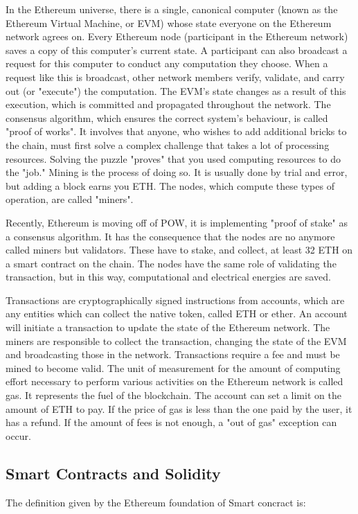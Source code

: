 \documentclass[a4paper,sigconf, language=french,
language=german, language=spanish, language=english]{acmart}
\begin{document}
In the Ethereum universe, there is a single, canonical computer (known as the Ethereum Virtual Machine, or EVM) whose state everyone on the Ethereum network agrees on. 
Every Ethereum node (participant in the Ethereum network) saves a copy of this computer's current state. 
A participant can also broadcast a request for this computer to conduct any computation they choose. 
When a request like this is broadcast, other network members verify, validate, and carry out (or "execute") the computation. 
The EVM's state changes as a result of this execution, which is committed and propagated throughout the network. The consensus algorithm, which ensures the correct system's behaviour, is called "proof of works". 
It involves that anyone, who wishes to add additional bricks to the chain, must first solve a complex challenge that takes a lot of processing resources.
Solving the puzzle "proves" that you used computing resources to do the "job."
Mining is the process of doing so. It is usually done by trial and error, but adding a block earns you ETH. The nodes, which compute these types of operation, are called "miners".

Recently, Ethereum is moving off of POW, it is implementing "proof of stake" as a consensus algorithm. It has the consequence that the nodes are no anymore called miners but validators. These have to stake, and collect, at least 32 ETH on a smart contract on the chain. The nodes have the same role of validating the transaction, but in this way, computational and electrical energies are saved.

Transactions are cryptographically signed instructions from accounts, which are any entities which can collect the native token, called ETH or ether. An account will initiate a transaction to update the state of the Ethereum network. 
The miners are responsible to collect the transaction, changing the state of the EVM and broadcasting those in the network. Transactions require a fee and must be mined to become valid. 
The unit of measurement for the amount of computing effort necessary to perform various activities on the Ethereum network is called gas. It represents the fuel of the blockchain. 
The account can set a limit on the amount of ETH to pay. If the price of gas is less than the one paid by the user, it has a refund. If the amount of fees is not enough, a "out of gas" exception can occur.



\subsection{Smart Contracts and Solidity}
The definition given by the Ethereum foundation of Smart concract is:
\end{document}
